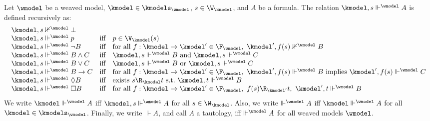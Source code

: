 \begin{definition}\label{def:sat:wmodel}
  Let $\wmodel$ be a weaved model, $\kmodel \in \kmodels_{\wmodel}$, $s \in \W_{\kmodel}$, and $A$ be a formula.
  The relation $\kmodel, s \Vdash^{\wmodel} A$ is defined recursively as:
  \[\begin{array}{lcl}
    \kmodel, s \nVdash^{\wmodel} \bot \\
    \kmodel, s \Vdash^{\wmodel} p & \text{iff} & p \in \V_{\kmodel}(s) \\
    \kmodel, s \Vdash^{\wmodel} \lnot B & \text{iff} & \text{for all } {f: \kmodel \to \kmodel'} \in \F_{\wmodel},~ \kmodel', f(s) \nVdash^{\wmodel} B \\
    \kmodel, s \Vdash^{\wmodel} B \land C & \text{iff} & \kmodel, s \Vdash^{\wmodel} B \text{ and } \kmodel, s \Vdash^{\wmodel} C \\
    \kmodel, s \Vdash^{\wmodel} B \lor C & \text{iff} & \kmodel, s \Vdash^{\wmodel} B \text{ or } \kmodel, s \Vdash^{\wmodel} C \\
    \kmodel, s \Vdash^{\wmodel} B \to C & \text{iff} & \text{for all } {f: \kmodel \to \kmodel'} \in \F_{\wmodel},~ \kmodel', f(s) \Vdash^{\wmodel} B \text{ implies } \kmodel', f(s) \Vdash^{\wmodel} C \\
    \kmodel, s \Vdash^{\wmodel} \Diamond B & \text{iff} & \text{exists } s \R_{\kmodel} t \text{ s.t.\ } \kmodel, t \Vdash^{\wmodel} B \\
    \kmodel, s \Vdash^{\wmodel} \Box B & \text{iff} & \text{for all } {f: \kmodel \to \kmodel'} \in \F_{\wmodel},~ f(s) \R_{\kmodel'} t,~ \kmodel', t \Vdash^{\wmodel} B
  \end{array}\]
  We write $\kmodel \Vdash^{\wmodel} A$ iff $\kmodel, s \Vdash^{\wmodel} A$ for all $s \in \W_{\kmodel}$.
  Also, we write $\Vdash^{\wmodel} A$ iff $\kmodel \Vdash^{\wmodel} A$ for all $\kmodel \in \kmodels_{\wmodel}$.
  Finally, we write $\Vdash A$, and call $A$ a tautology, iff $\Vdash^{\wmodel} A$ for all weaved models $\wmodel$.
\end{definition}


